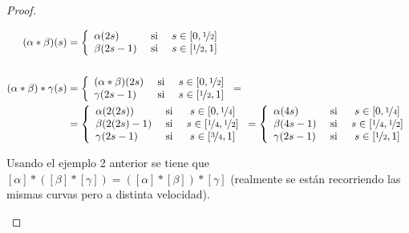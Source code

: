 \begin{teo}
\begin{proof}
\begin{enumerate}
\begin{align*}
                (\alpha\ast\beta)(s) &= \left\{
                    \begin{array}{l c c}
                        \alpha(2s) & \text{ si } & s \in [0,\nicefrac{1}{2}]\\
                        \beta(2s-1) & \text{ si } & s \in [\nicefrac{1}{2},1]\\
                    \end{array}
                \right.\\\\
                (\alpha \ast\beta)\ast\gamma(s) &= \left\{
                    \begin{array}{l c c}
                        (\alpha\ast\beta)(2s) & \text{ si } & s \in [0,\nicefrac{1}{2}]\\
                        \gamma(2s-1) & \text{ si } & s \in [\nicefrac{1}{2},1]\\
                    \end{array}
                \right. =\\
                &= \left\{
                    \begin{array}{l c c}
                        \alpha(2(2s)) & \text{ si } & s \in [0,\nicefrac{1}{4}]\\
                        \beta(2(2s)-1) & \text{ si } & s \in [\nicefrac{1}{4},\nicefrac{1}{2}]\\
                        \gamma(2s-1) & \text{ si } & s \in [\nicefrac{3}{4},1]\\
                    \end{array}
                \right. = \left\{
                    \begin{array}{l c c}
                        \alpha(4s) & \text{ si } & s \in [0,\nicefrac{1}{4}]\\
                        \beta(4s-1) & \text{ si } & s \in [\nicefrac{1}{4},\nicefrac{1}{2}]\\
                        \gamma(2s-1) & \text{ si } & s \in [\nicefrac{1}{2},1]\\
                    \end{array}
                \right.
            \end{align*}

            Usando el ejemplo 2 anterior se tiene que $[\alpha] \ast ([\beta] \ast [\gamma]) = ([\alpha] \ast [\beta]) \ast [\gamma]$ (realmente se están recorriendo las mismas curvas pero a distinta velocidad).
        \end{enumerate}
    \end{proof}
\end{teo}